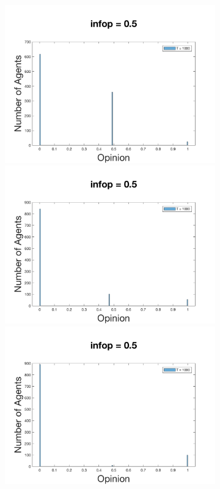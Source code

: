 \documentclass[11pt]{article}
\begin{document}
\begin{figure}[!htb]
\begin{subfigure}[!htb]{\textwidth}
  \includegraphics[width=\linewidth]{p_5/gen_plot_201712171365898973e+01.png}
\endminipage\hfill
{}
  \includegraphics[width=\linewidth]{p_10/gen_plot_2017121712596271176e+00.png}
\endminipage\hfill
{}
  \includegraphics[width=\linewidth]{p_20/gen_plot_201712171362013207e+01.png}
\endminipage
\end{subfigure}


\end{figure}
\end{document}
